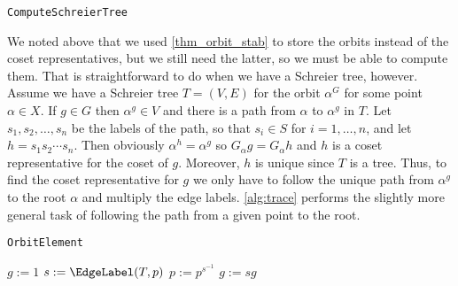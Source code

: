 \begin{algorithm} 
\dontprintsemicolon
\caption{\texttt{ComputeSchreierTree}}
\label{alg:orbit}
\end{algorithm}
We noted above that we used \ref{thm_orbit_stab} to store the orbits
instead of the coset representatives, but we still need the latter, so
we must be able to compute them. That is straightforward to do when we
have a Schreier tree, however.  Assume we have a Schreier tree $T =
(V, E)$ for the orbit $\alpha^G$ for some point $\alpha \in X$. If $g
\in G$ then $\alpha^g \in V$ and there is a path from $\alpha$ to
$\alpha^g$ in $T$. Let $s_1, s_2, \dotsc, s_n$ be the labels of the
path, so that $s_i \in S$ for $i = 1, \dotsc, n$, and let $h = s_1 s_2
\dotsm s_n$. Then obviously $\alpha^h = \alpha^g$ so $G_{\alpha} g = 
G_{\alpha} h$ and $h$ is a coset representative for the coset of $g$.
Moreover, $h$ is unique since $T$ is a tree. Thus, to find the coset
representative for $g$ we only have to follow the unique path from
$\alpha^g$ to the root $\alpha$ and multiply the edge labels. \ref{alg:trace} performs the slightly more general task of
following the path from a given point to the root.

\begin{algorithm} 
\dontprintsemicolon
\caption{\texttt{OrbitElement}}
\Begin
{
  $g := 1$ \;
  {
    $s := \EdgeLabel(T, p)$ \;
    $p := p^{s^{-1}}$ \;
    $g := s g$ \;
  }
}
\label{alg:trace}
\end{algorithm}

